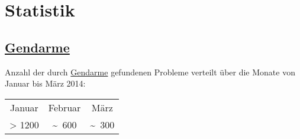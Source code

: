 %



\newpage



\section{Statistik}
\label{Abschnitt:Programmfehler:Statistik}





\subsection*{\hyperref[Abschnitt:Programmfehler:Werkzeuge:Automatisiert]{Gendarme}}

Anzahl der durch \hyperref[Abschnitt:Programmfehler:Werkzeuge:Automatisiert]{Gendarme} gefundenen Probleme verteilt über die Monate von Januar bis März 2014:\\

\begin{longtable}{ccc}

	  Januar
	& Februar
	& März
	
	\\
	
      > 1200
	& \textasciitilde~600
	& \textasciitilde~300

\end{longtable}




